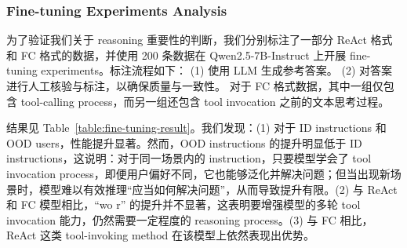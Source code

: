 \documentclass[11pt]{article}
\begin{document}
\subsubsection{Fine-tuning Experiments Analysis}
为了验证我们关于 reasoning 重要性的判断，我们分别标注了一部分 ReAct 格式和 FC 格式的数据，并使用 200 条数据在 Qwen2.5-7B-Instruct 上开展 fine-tuning experiments。标注流程如下：
(1) 使用 LLM 生成参考答案。
(2) 对答案进行人工核验与标注，以确保质量与一致性。
对于 FC 格式数据，其中一组仅包含 tool-calling process，而另一组还包含 tool invocation 之前的文本思考过程。

结果见 Table~\ref{table:fine-tuning-result}。我们发现：(1) 对于 ID instructions 和 OOD users，性能提升显著。然而，OOD instructions 的提升明显低于 ID instructions，这说明：对于同一场景内的 instruction，只要模型学会了 tool invocation process，即便用户偏好不同，它也能够泛化并解决问题；但当出现新场景时，模型难以有效推理“应当如何解决问题”，从而导致提升有限。(2) 与 ReAct 和 FC 模型相比，“wo r” 的提升并不显著，这表明要增强模型的多轮 tool invocation 能力，仍然需要一定程度的 reasoning process。(3) 与 FC 相比，ReAct 这类 tool-invoking method 在该模型上依然表现出优势。
\end{document}
